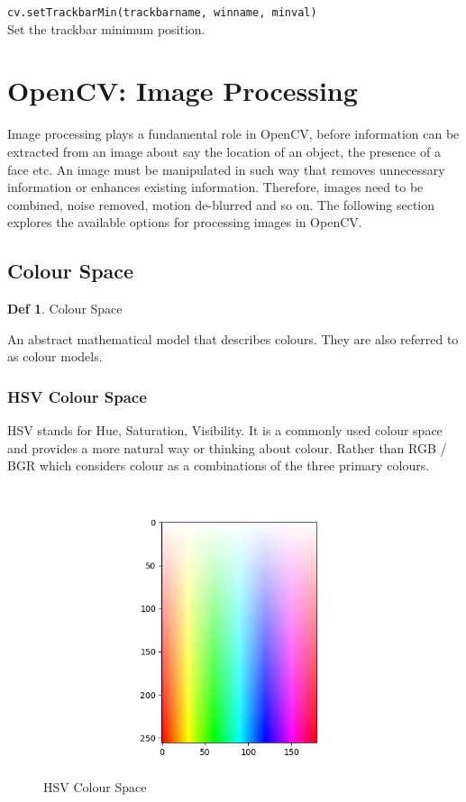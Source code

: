 \documentclass{article}
\theoremstyle{definition}
\newtheorem{df}{Def}
\theoremstyle{remark}
\newcommand{\func}[2]{\noindent\lstinline{#1}\\#2}
\begin{document}
\func{cv.setTrackbarMin(trackbarname, winname, minval)}{Set the trackbar minimum position.\\}




\break


\section{OpenCV: Image Processing}

Image processing plays a fundamental role in OpenCV, before information can be extracted from an image about say the location of an object, the presence of a face etc. An image must be manipulated in such way that removes unnecessary information or enhances existing information. Therefore, images need to be combined, noise removed, motion de-blurred and so on. The following section explores the available options for processing images in OpenCV.

\subsection{Colour Space}

\begin{df} Colour Space

An abstract mathematical model that describes colours. They are also referred to as colour models.
\end{df}


\subsubsection{HSV Colour Space}

HSV stands for Hue, Saturation, Visibility. It is a commonly used colour space and provides a more natural way or thinking about colour. Rather than RGB / BGR which considers colour as a combinations of the three primary colours.

\begin{figure}[h!]
    \centering
    \includegraphics[width=\textwidth]{HSV_col_space}
    \caption{HSV Colour Space}
    \label{fig:hsv_cls}
\end{figure}
\end{document}
